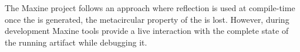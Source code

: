 The Maxine project follows an approach where reflection is used at compile-time \ie once the \VM is generated, the metacircular property of the \VM is lost. However, during development Maxine tools provide a live interaction with the complete state of the running \VM artifact while debugging it.

%
%

